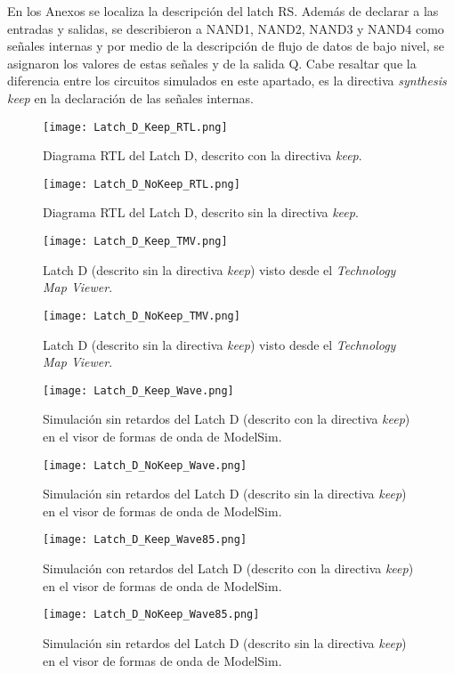 En los Anexos se localiza la descripción del latch RS. Además de declarar a las entradas y salidas, se describieron a NAND1, NAND2, NAND3 y NAND4 como señales internas y por medio de la descripción de flujo de datos de bajo nivel, se asignaron los valores de estas señales y de la salida Q. Cabe resaltar que la diferencia entre los circuitos simulados en este apartado, es la directiva \textit{synthesis keep} en la declaración de las señales internas.

\begin{figure}[ht]
	\centering
	\texttt{[image: Latch\_D\_Keep\_RTL.png]}
	\caption{Diagrama RTL del Latch D, descrito con la directiva \textit{keep}. \label{fig:Latch_D_Keep_RTL}}
\end{figure}

\begin{figure}[ht]
	\centering
	\texttt{[image: Latch\_D\_NoKeep\_RTL.png]}
	\caption{Diagrama RTL del Latch D, descrito sin la directiva \textit{keep}. \label{fig:Latch_D_NoKeep_RTL}}
\end{figure}

\begin{figure}[ht]
	\centering
	\texttt{[image: Latch\_D\_Keep\_TMV.png]}
	\caption{Latch D (descrito sin la directiva \textit{keep}) visto desde el \textit{Technology Map Viewer}. \label{fig:Latch_D_Keep_TMV}}
\end{figure}

\begin{figure}[ht]
	\centering
	\texttt{[image: Latch\_D\_NoKeep\_TMV.png]}
	\caption{Latch D (descrito sin la directiva \textit{keep}) visto desde el \textit{Technology Map Viewer}. \label{fig:Latch_D_NoKeep_TMV}}
\end{figure}

\begin{figure}[ht]
	\centering
	\texttt{[image: Latch\_D\_Keep\_Wave.png]}
	\caption{Simulación sin retardos del Latch D (descrito con la directiva \textit{keep}) en el visor de formas de onda de ModelSim. \label{fig:Latch_D_Keep_Wave}}
\end{figure}

\begin{figure}[ht]
	\centering
	\texttt{[image: Latch\_D\_NoKeep\_Wave.png]}
	\caption{Simulación sin retardos del Latch D (descrito sin la directiva \textit{keep}) en el visor de formas de onda de ModelSim. \label{fig:Latch_D_NoKeep_Wave}}
\end{figure}

\begin{figure}[ht]
	\centering
	\texttt{[image: Latch\_D\_Keep\_Wave85.png]}
	\caption{Simulación con retardos del Latch D (descrito con la directiva \textit{keep}) en el visor de formas de onda de ModelSim. \label{fig:Latch_D_Keep_Wave85}}
\end{figure}

\begin{figure}[ht]
	\centering
	\texttt{[image: Latch\_D\_NoKeep\_Wave85.png]}
	\caption{Simulación sin retardos del Latch D (descrito sin la directiva \textit{keep}) en el visor de formas de onda de ModelSim. \label{fig:Latch_D_NoKeep_Wave85}}
\end{figure}